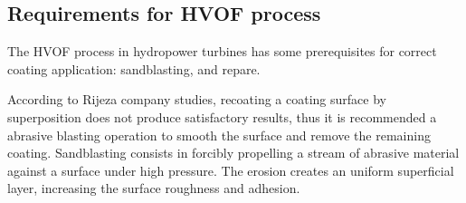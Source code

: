 \subsection{Requirements for HVOF process}

The HVOF process in hydropower turbines has some prerequisites for correct
coating application: sandblasting, and repare. %


According to Rijeza company studies, recoating a coating surface by
superposition does not produce satisfactory results, thus it is recommended
a abrasive blasting operation to smooth the surface and remove the remaining
coating. Sandblasting consists in forcibly propelling a stream of abrasive material
against a surface under high pressure. The erosion creates an uniform
superficial layer, increasing the surface roughness and
adhesion.



